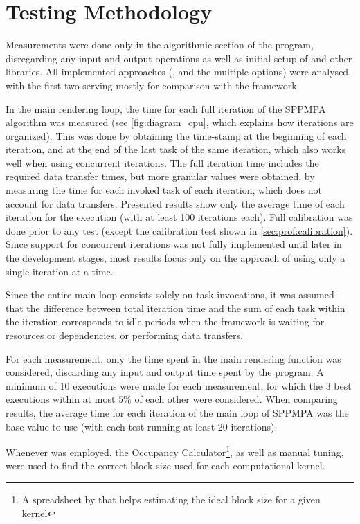 \documentclass[main.tex]{subfiles}
\begin{document}
\section{Testing Methodology} \label{sec:results:method}

Measurements were done only in the algorithmic section of the program, disregarding any input and output operations as well as initial setup of \starpu and other libraries. All implemented approaches (\cpu, \gpu and the multiple \starpu options) were analysed, with the first two serving mostly for comparison with the framework.

In the main rendering loop, the time for each full iteration of the SPPMPA algorithm was measured (see \cref{fig:diagram_cpu}, which explains how iterations are organized). This was done by obtaining the time-stamp at the beginning of each iteration, and at the end of the last task of the same iteration, which also works well when using concurrent iterations. The full iteration time includes the required data transfer times, but more granular values were obtained, by measuring the time for each invoked task of each iteration, which does not account for data transfers. Presented results show only the average time of each iteration for the execution (with at least 100 iterations each). Full calibration was done prior to any \starpu test (except the calibration test shown in \cref{sec:prof:calibration}).
Since support for concurrent iterations was not fully implemented until later in the development stages, most results focus only on the approach of using only a single iteration at a time.

Since the entire main loop consists solely on task invocations, it was assumed that the difference between total iteration time and the sum of each task within the iteration corresponds to idle periods when the framework is waiting for resources or dependencies, or performing data transfers.

For each measurement, only the time spent in the main rendering function was considered, discarding any input and output time spent by the program. A minimum of 10 executions were made for each measurement, for which the 3 best executions within at most $5\%$ of each other were considered. When comparing results, the average time for each iteration of the main loop of SPPMPA was the base value to use (with each test running at least 20 iterations).

Whenever \cuda was employed, the \cuda Occupancy Calculator\footnote{A spreadsheet by \nvidia that helps estimating the ideal block size for a given kernel}, as well as manual tuning, were used to find the correct block size used for each computational kernel.
\end{document}
